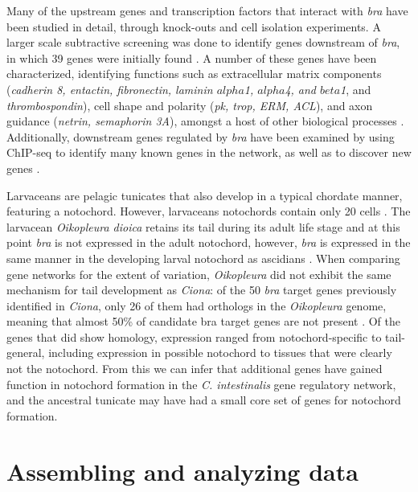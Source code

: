 Many of the upstream genes and transcription factors that interact with \textit{bra} have been studied in detail, through knock-outs and cell isolation experiments. A larger scale subtractive screening was done to identify genes downstream of \textit{bra}, in which 39 genes were initially found \cite{hotta_temporal_1999}. A number of these genes have been characterized, identifying functions such as extracellular matrix components (\textit{cadherin 8, entactin, fibronectin, laminin $alpha$1, $alpha$4, and $beta$1}, and {\em thrombospondin}), cell shape and polarity (\textit{pk, trop, ERM, ACL}), and axon guidance (\textit{netrin, semaphorin 3A}), amongst a host of other biological processes \cite{hotta_characterization_2000,hotta_brachyury-downstream_2007,kugler_evolutionary_2008}. Additionally, downstream genes regulated by \textit{bra} have been examined by using ChIP-seq to identify many known genes in the network, as well as to discover new genes \cite{kubo_genomic_2010,katikala_functional_2013}.

Larvaceans are pelagic tunicates that also develop in a typical chordate manner, featuring  a notochord. However, larvaceans notochords contain only 20 cells \cite{seo_miniature_2001,denoeud_plasticity_2010}. The larvacean  \textit{Oikopleura dioica} retains its tail during its adult life stage and at this point \textit{bra} is not expressed in the adult notochord, however, \textit{bra} is expressed in the same manner in the developing larval notochord as ascidians \cite{bassham_brachyury_2000,nishida_development_2008}. When comparing gene networks for the extent of variation, \textit{Oikopleura} did not exhibit the same mechanism for tail development as \textit{Ciona}: of the 50 {\em bra} target genes previously identified in \textit{Ciona}, only 26 of them had orthologs in the \textit{Oikopleura} genome, meaning that almost 50\% of candidate bra target  genes are not present \cite{kugler_evolutionary_2011}. Of the genes that did show homology, expression ranged from notochord-specific to tail-general, including expression in possible notochord to tissues that were clearly not the notochord. From this we can infer that additional genes have gained function in notochord formation in the \textit{C. intestinalis} gene regulatory network, and the ancestral tunicate may have had a small core set of genes for notochord formation.

\section{Assembling and analyzing data}

